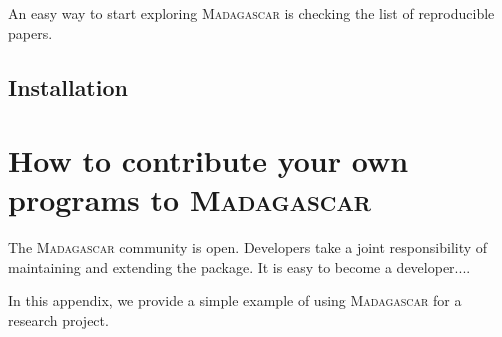 An easy way to start exploring \textsc{Madagascar} is checking the list of reproducible papers. 

\subsection{Installation}

\section{How to contribute your own programs to \textsc{Madagascar}}

The \textsc{Madagascar} community is open. Developers take a joint
responsibility of maintaining and extending the package. It is easy to
become a developer....





In this appendix, we provide a simple example of using
\textsc{Madagascar} for a research project.


